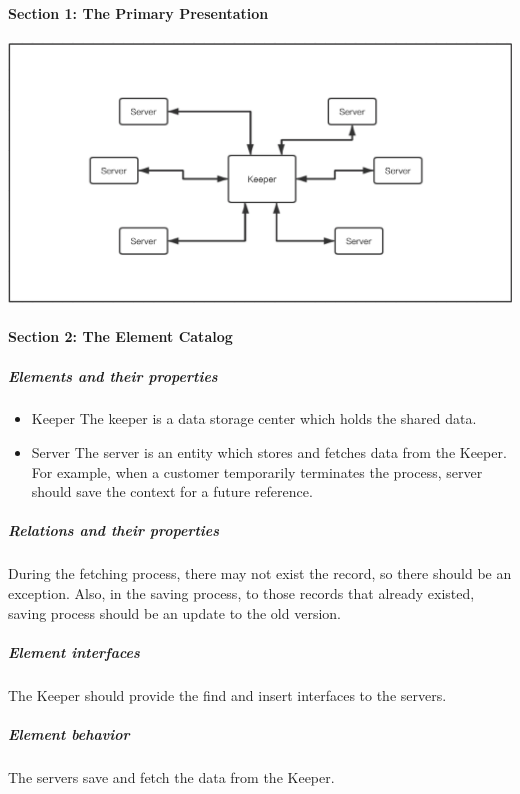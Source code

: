 \documentclass{article}
\begin{document}
			\paragraph{Section 1: The Primary Presentation}
			\begin{center}
			\includegraphics[scale=0.3]{share.png}
			\end{center}
			\paragraph{Section 2: The Element Catalog}
			\subparagraph{Elements and their properties}
			\begin{itemize}
			\item{Keeper} The keeper is a data storage center which holds the shared data.
			\item{Server} The server is an entity which stores and fetches data from the Keeper. For example, when a customer temporarily terminates the process, server should save the context for a future reference.
			\end{itemize}
			\subparagraph{Relations and their properties}
			During the fetching process, there may not exist the record, so there should be an exception. Also, in the saving process, to those records that already existed, saving process should be an update to the old version.
			\subparagraph{Element interfaces}
			The Keeper should provide the find and insert interfaces to the servers.
			\subparagraph{Element behavior}
			The servers save and fetch the data from the Keeper.
\end{document}
